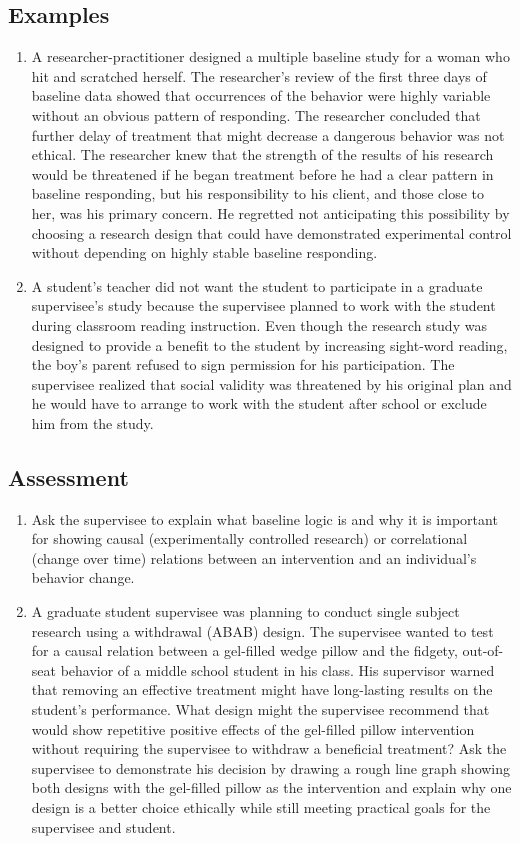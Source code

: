 \subsection{Examples}
\begin{enumerate}
\item A researcher-practitioner designed a multiple baseline study for a woman who hit and scratched herself. The researcher's review of the first three days of baseline data showed that occurrences of the behavior were highly variable without an obvious pattern of responding. The researcher concluded that further delay of treatment that might decrease a dangerous behavior was not ethical. The researcher knew that the strength of the results of his research would be threatened if he began treatment before he had a clear pattern in baseline responding, but his responsibility to his client, and those close to her, was his primary concern. He regretted not anticipating this possibility by choosing a research design that could have demonstrated experimental control without depending on highly stable baseline responding.
\item A student's teacher did not want the student to participate in a graduate supervisee's study because the supervisee planned to work with the student during classroom reading instruction. Even though the research study was designed to provide a benefit to the student by increasing sight-word reading, the boy's parent refused to sign permission for his participation. The supervisee realized that social validity was threatened by his original plan and he would have to arrange to work with the student after school or exclude him from the study.
\end{enumerate}
%
\subsection{Assessment}
\begin{enumerate}
\item Ask the supervisee to explain what baseline logic is and why it is important for showing causal (experimentally controlled research) or correlational (change over time) relations between an intervention and an individual's behavior change. 
\item A graduate student supervisee was planning to conduct single subject research using a withdrawal (ABAB) design. The supervisee wanted to test for a causal relation between a gel-filled wedge pillow and the fidgety, out-of-seat behavior of a middle school student in his class. His supervisor warned that removing an effective treatment might have long-lasting results on the student's performance. What design might the supervisee recommend that would show repetitive positive effects of the gel-filled pillow intervention without requiring the supervisee to withdraw a beneficial treatment? Ask the supervisee to demonstrate his decision by drawing a rough line graph showing both designs with the gel-filled pillow as the intervention and explain why one design is a better choice ethically while still meeting practical goals for the supervisee and student. 
\end{enumerate}
%
